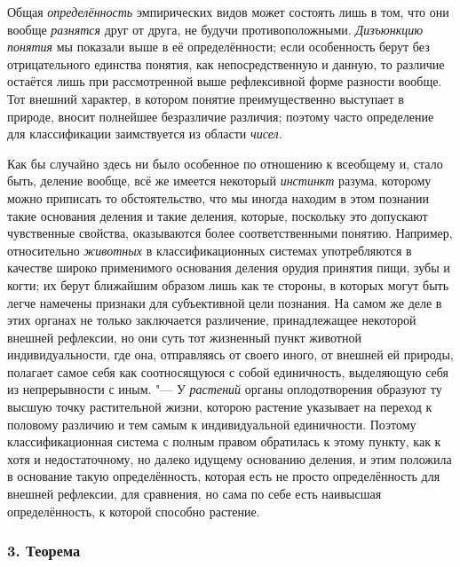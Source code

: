 Общая {\em определённость}
эмпирических видов может состоять лишь в том, что они вообще
{\em разнятся} друг от
друга, не будучи противоположными.
{\em Дизъюнкцию понятия}
мы показали выше в её определённости; если особенность берут
без отрицательного единства понятия, как непосредственную и данную, то
различие остаётся лишь при рассмотренной выше рефлексивной форме разности
вообще. Тот внешний характер, в котором понятие преимущественно выступает в
природе, вносит полнейшее безразличие различия; поэтому часто определение
для классификации заимствуется из области
{\em чисел}.

Как бы случайно здесь ни было особенное по отношению к
всеобщему и, стало быть, деление вообще, всё же имеется некоторый
{\em инстинкт} разума,
которому можно приписать то обстоятельство, что мы иногда находим в этом
познании такие основания деления и такие деления, которые, поскольку это
допускают чувственные свойства, оказываются более соответственными понятию.
Например, относительно {\em животных}
в классификационных системах употребляются в качестве широко
применимого основания деления орудия принятия пищи, зубы и когти; их берут
ближайшим образом лишь как те стороны, в которых могут быть легче намечены
признаки для субъективной цели познания. На самом же деле в этих органах не
только заключается различение, принадлежащее некоторой внешней рефлексии,
но они суть тот жизненный пункт животной индивидуальности, где она,
отправляясь от своего иного, от внешней ей природы, полагает самое себя
как соотносящуюся с собой единичность, выделяющую себя из непрерывности с
иным. "--- У {\em растений} органы
оплодотворения образуют ту высшую точку растительной жизни, которою
растение указывает на переход к половому различию и тем самым к
индивидуальной единичности. Поэтому классификационная система с полным
правом обратилась к этому пункту, как к хотя и недостаточному, но далеко
идущему основанию деления, и этим положила в основание такую
определённость, которая есть не просто определённость для внешней
рефлексии, для сравнения, но сама по себе есть наивысшая определённость, к
которой способно растение.

\subsubsection[3. Теорема]{\bfseries 3. Теорема}

